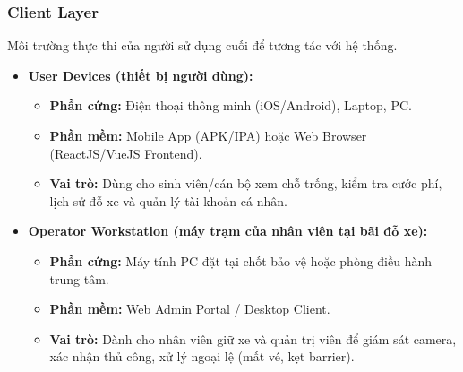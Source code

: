 \subsubsection{Client Layer}
Môi trường thực thi của người sử dụng cuối để tương tác với hệ thống.
\begin{itemize}
    \item \textbf{User Devices (thiết bị người dùng):}
    \begin{itemize}
        \item \textbf{Phần cứng:} Điện thoại thông minh (iOS/Android), Laptop, PC.
        \item \textbf{Phần mềm:} Mobile App (APK/IPA) hoặc Web Browser (ReactJS/VueJS Frontend).
        \item \textbf{Vai trò:} Dùng cho sinh viên/cán bộ xem chỗ trống, kiểm tra cước phí, lịch sử đỗ xe và quản lý tài khoản cá nhân.
    \end{itemize}
    \item \textbf{Operator Workstation (máy trạm của nhân viên tại bãi đỗ xe):}
    \begin{itemize}
        \item \textbf{Phần cứng:} Máy tính PC đặt tại chốt bảo vệ hoặc phòng điều hành trung tâm.
        \item \textbf{Phần mềm:} Web Admin Portal / Desktop Client.
        \item \textbf{Vai trò:} Dành cho nhân viên giữ xe và quản trị viên để giám sát camera, xác nhận thủ công, xử lý ngoại lệ (mất vé, kẹt barrier).
    \end{itemize}
\end{itemize}

